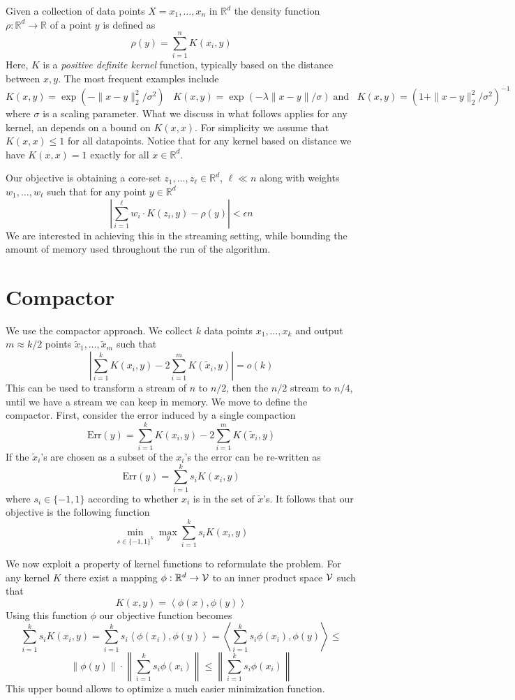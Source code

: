 \documentclass{article} %
\newcommand{\ip}[1]{\left \langle #1 \right \rangle}
\newcommand{\R}{\mathbb{R}}
\newcommand{\D}{\rho}
\newcommand{\eps}{\epsilon}
\begin{document}
Given a collection of data points $X = x_1,\ldots, x_n$ in $\R^d$ the density function $\rho: \R^d \rightarrow \R$ of a point $y$ is defined as 
$$ \rho(y) = \sum_{i=1}^{n} K(x_i,y) $$
Here, $K$ is a \emph{positive definite kernel} function, typically based on the distance between $x,y$. The most frequent examples include
$$ K(x,y) = \exp(- \|x-y\|_2^2/\sigma^2)\;\;\; K(x,y) = \exp(-\lambda \|x-y\|/\sigma) \; \mbox{and}\;\;\; K(x,y) = (1+\|x-y\|_2^2/\sigma^2)^{-1}$$
where $\sigma$ is a scaling parameter. What we discuss in what follows applies for any kernel, an depends on a bound on $K(x,x)$. For simplicity we assume that $K(x,x) \leq 1$ for all datapoints. Notice that for any kernel based on distance we have $K(x,x)=1$ exactly for all $x \in \R^d$.

Our objective is obtaining a core-set $z_1,\ldots, z_\ell \in \R^d$, $\ell \ll n$ along with weights $w_1,\ldots, w_\ell$ such that for any point $y \in \R^d$
$$ \left| \sum_{i=1}^\ell w_i \cdot K(z_i, y) - \D(y) \right| < \eps n $$
We are interested in achieving this in the streaming setting, while bounding the amount of memory used throughout the run of the algorithm.

\section{Compactor}
We use the compactor approach. We collect $k$ data points $x_1,\ldots, x_k$ and output $m \approx k/2$ points $\tilde{x}_1,\ldots, \tilde{x}_m$ such that 
$$ \left| \sum_{i =1}^k K(x_i,y) - 2\sum_{i=1}^m K(\tilde{x}_i, y) \right| = o(k)$$
This can be used to transform a stream of $n$ to $n/2$, then the $n/2$ stream to $n/4$, until we have a stream we can keep in memory. We move to define the compactor. First, consider the error induced by a single compaction
$$ \text{Err}(y) = \sum_{i =1}^k K(x_i,y) - 2\sum_{i=1}^m K(\tilde{x}_i, y) $$
If the $\tilde{x}_i$'s are chosen as a subset of the $x_i$'s the error can be re-written as
$$ \text{Err}(y) = \sum_{i=1}^k s_i K(x_i,y)  $$
where $s_i \in \{-1, 1\}$ according to whether $x_i$ is in the set of $\tilde{x}$'s. It follows that our objective is the following function
$$ \min_{s \in \{-1,1\}^k} \max_y \sum_{i=1}^k s_i K(x_i,y) $$

We now exploit a property of kernel functions to reformulate the problem. For any kernel $K$ there exist a mapping $\phi: \R^d \to {\cal V}$ to an inner product space $\cal V$ such that 
$$ K(x,y) = \ip{\phi(x), \phi(y)} $$
Using this function $\phi$ our objective function becomes
$$\sum_{i=1}^k s_i K(x_i,y) = \sum_{i=1}^k s_i \ip{\phi(x_i), \phi(y)} =  \ip{ \sum_{i=1}^k s_i \phi(x_i), \phi(y)} \leq $$
$$ \|\phi(y)\| \cdot \left\|  \sum_{i=1}^k s_i \phi(x_i) \right\| \leq  \left\|  \sum_{i=1}^k s_i \phi(x_i) \right\| $$
This upper bound allows to optimize a much easier minimization function. 
\end{document}
